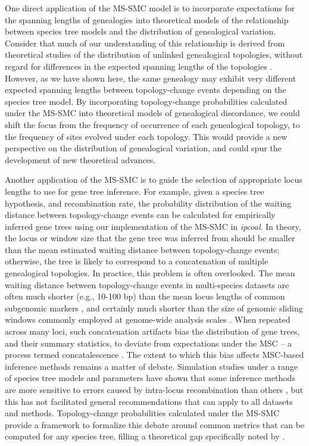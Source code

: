 \documentclass[11pt]{article}
\begin{document}
One direct application of the MS-SMC model is to incorporate expectations
for the spanning lengths of genealogies into theoretical models of the
relationship between species tree models and the distribution of
genealogical variation.
% 
Consider that much of our understanding of this relationship is derived
from theoretical studies of the distribution of unlinked genealogical
topologies, without regard for differences in the expected spanning 
lengths of the topologies
\citep{degnan2005gene,degnan2006discordance}.
% 
However, as we have shown here, the same genealogy may exhibit 
very different expected spanning lengths between topology-change events
depending on the species tree model.
% 
By incorporating topology-change probabilities calculated under the
MS-SMC into theoretical models of genealogical discordance, we could shift
the focus from the frequency of occurrence of each genealogical topology, 
to the frequency of sites evolved under each topology. This would provide
a new perspective on the distribution of genealogical variation, and could
spur the development of new theoretical advances.


Another application of the MS-SMC 
is to guide the selection of appropriate locus lengths to use for gene
tree inference.
% 
For example, given a species tree hypothesis, and recombination rate, 
the probability distribution of the waiting distance between topology-change
events can be calculated for empirically inferred gene trees using our
implementation of the MS-SMC in \emph{ipcoal}. 
In theory, the locus or window size that the gene tree was inferred from
should be smaller than the mean estimated waiting distance between 
topology-change events; otherwise, the tree is likely to correspond 
to a concatenation of multiple genealogical topologies.
% 
In practice, this problem is often overlooked. The mean waiting distance
between topology-change events in multi-species datasets are often much
shorter (e.g., 10-100 bp) than the mean locus lengths of common subgenomic
markers \citep[e.g., $>$300 bp;][]{mckenzie_multispecies_2020},
and certainly much shorter than the size of genomic sliding windows 
commonly employed at genome-wide analysis scales 
\citep[e.g., 100 Kb;][]{li2019recombination}.
% 
When repeated across many loci, such concatenation artifacts bias the distribution
of gene trees, and their summary statistics, to deviate from expectations under
the MSC -- a process termed concatalescence \citep{gatesy_concatenation_2013}.
% 
The extent to which this bias affects MSC-based inference methods remains
a matter of debate.
Simulation studies under a range of species tree models and parameters
have shown that some inference methods are more sensitive to errors caused
by intra-locus recombination than others
\citep{lanier2012recombination,zhu2022simulation}, but this has not 
facilitated general recommendations that can apply to all datasets and 
methods.
% 
Topology-change probabilities calculated under the MS-SMC provide a framework
to formalize this debate around common metrics that can be computed for any 
species tree, filling a theoretical gap specifically noted by 
\citet{zhu2022simulation}.
\end{document}
